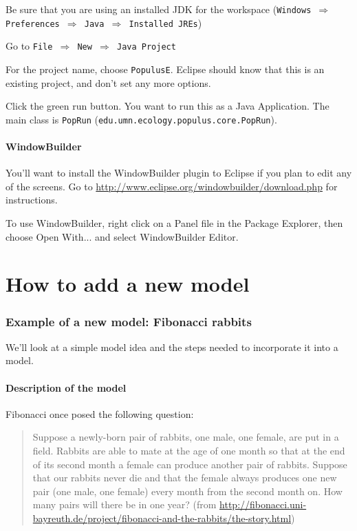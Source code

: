 \documentclass[12pt]{article}
\begin{document}
Be sure that you are using an installed JDK for the workspace (\texttt{Windows $\Rightarrow$ Preferences $\Rightarrow$ Java $\Rightarrow$ Installed JREs})

Go to \texttt{File $\Rightarrow$ New $\Rightarrow$ Java Project}


For the project name, choose \texttt{PopulusE}.  Eclipse should know that this is an existing project, and don't set any more options.

Click the green run button.  You want to run this as a Java Application.  The main class is \texttt{PopRun} (\texttt{edu.umn.ecology.populus.core.PopRun}).

\subsection{WindowBuilder}
You'll want to install the WindowBuilder plugin to Eclipse if you plan to edit any of the screens.  Go to \url{http://www.eclipse.org/windowbuilder/download.php} for instructions.

To use WindowBuilder, right click on a Panel file in the Package Explorer, then choose Open With... and select WindowBuilder Editor.

\part{How to add a new model}
\section{Example of a new model: Fibonacci rabbits}

We'll look at a simple model idea and the steps needed to incorporate it into a model.

\subsection{Description of the model}
Fibonacci once posed the following question:

\begin{quote}
Suppose a newly-born pair of rabbits, one male, one female, are put in a field. Rabbits are able to mate at the age of one month so that at the end of its second month a female can produce another pair of rabbits. Suppose that our rabbits never die and that the female always produces one new pair (one male, one female) every month from the second month on. How many pairs will there be in one year?  (from \url{http://fibonacci.uni-bayreuth.de/project/fibonacci-and-the-rabbits/the-story.html})
\end{quote}
\end{document}
